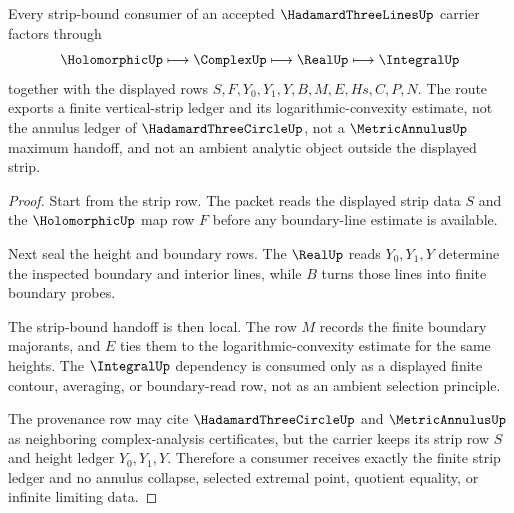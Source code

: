 \begin{theorem}
\label{thm:hadamard-three-lines-strip-bound-route}
Every strip-bound consumer of an accepted $\HadamardThreeLinesUp$ carrier factors through
$$
\HolomorphicUp \longmapsto \ComplexUp \longmapsto \RealUp \longmapsto \IntegralUp
$$
together with the displayed rows $S,F,Y_0,Y_1,Y,B,M,E,Hs,C,P,N$. The route exports a finite vertical-strip ledger and its logarithmic-convexity estimate, not the annulus ledger of $\HadamardThreeCircleUp$, not a $\MetricAnnulusUp$ maximum handoff, and not an ambient analytic object outside the displayed strip.
\end{theorem}
\begin{proof}
Start from the strip row. The packet reads the displayed strip data $S$ and the $\HolomorphicUp$ map row $F$ before any boundary-line estimate is available.

Next seal the height and boundary rows. The $\RealUp$ reads $Y_0,Y_1,Y$ determine the inspected boundary and interior lines, while $B$ turns those lines into finite boundary probes.

The strip-bound handoff is then local. The row $M$ records the finite boundary majorants, and $E$ ties them to the logarithmic-convexity estimate for the same heights. The $\IntegralUp$ dependency is consumed only as a displayed finite contour, averaging, or boundary-read row, not as an ambient selection principle.

The provenance row may cite $\HadamardThreeCircleUp$ and $\MetricAnnulusUp$ as neighboring complex-analysis certificates, but the carrier keeps its strip row $S$ and height ledger $Y_0,Y_1,Y$. Therefore a consumer receives exactly the finite strip ledger and no annulus collapse, selected extremal point, quotient equality, or infinite limiting data.
\end{proof}

